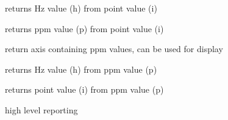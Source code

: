 \documentclass[letterpaper,10pt,openany,oneside]{sphinxmanual}
\begin{document}
\begin{fulllineitems}

\begin{fulllineitems}
\label{rst/code:NPKData.NMRAxis.itoh}
returns Hz value (h) from point value (i)

\end{fulllineitems}


\begin{fulllineitems}
\label{rst/code:NPKData.NMRAxis.itop}
returns ppm value (p) from point value (i)

\end{fulllineitems}


\begin{fulllineitems}
\label{rst/code:NPKData.NMRAxis.ppm_axis}
return axis containing ppm values, can be used for display

\end{fulllineitems}


\begin{fulllineitems}
\label{rst/code:NPKData.NMRAxis.ptoh}
returns Hz value (h) from ppm value (p)

\end{fulllineitems}


\begin{fulllineitems}
\label{rst/code:NPKData.NMRAxis.ptoi}
returns point value (i) from ppm value (p)

\end{fulllineitems}


\begin{fulllineitems}
\label{rst/code:NPKData.NMRAxis.report}
high level reporting

\end{fulllineitems}


\end{fulllineitems}
\end{document}
